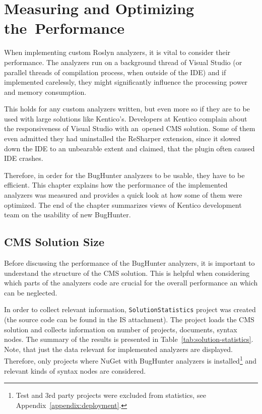 \documentclass[
  digital, %
  table,   %
  lof,     %
  lot,     %
  oneside,
]{fithesis3}
\begin{document}
\chapter{Measuring and Optimizing the~Performance}
\label{chap:performance}
When implementing custom Roslyn analyzers, it is vital to consider their performance. The analyzers run on a background thread of Visual Studio (or parallel threads of compilation process, when outside of the IDE) and if implemented carelessly, they might significantly influence the processing power and memory consumption.

 This holds for any custom analyzers written, but even more so if they are to be used with large solutions like Kentico's. Developers at Kentico complain about the responsiveness of Visual Studio with an~opened CMS solution. Some of them even admitted they had uninstalled the ReSharper extension, since it slowed down the IDE to an unbearable extent and claimed, that the plugin often caused IDE crashes. 

Therefore, in order for the BugHunter analyzers to be usable, they have to be efficient. This chapter explains how the performance of the implemented analyzers was measured and provides a quick look at how some of them were optimized. The end of the chapter summarizes views of Kentico development team on the usability of new BugHunter.

\section{CMS Solution Size}
Before discussing the performance of the BugHunter analyzers, it is important to understand the structure of the CMS solution. This is helpful when considering which parts of the analyzers code are crucial for the overall performance an which can be neglected.

In order to collect relevant information, \texttt{SolutionStatistics} project was created (the source code can be found in the IS attachment). The project loads the CMS solution and collects information on number of projects, documents, syntax nodes. The summary of the results is presented in Table~\ref{tab:solution-statistics}. Note, that just the data relevant for implemented analyzers are displayed. Therefore, only projects where NuGet with BugHunter analyzers is installed\footnote{Test and 3rd party projects were excluded from statistics, see Appendix~\ref{appendix:deployment}.} and relevant kinds of syntax nodes are considered.
\end{document}
